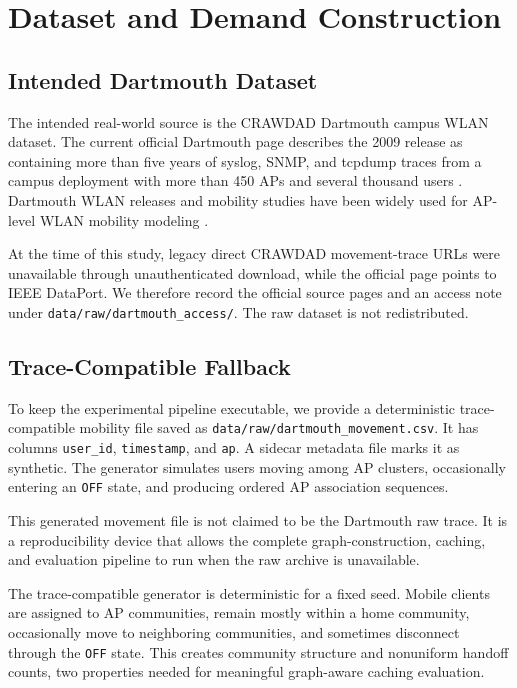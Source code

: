 \section{Dataset and Demand Construction}

\subsection{Intended Dartmouth Dataset}

The intended real-world source is the CRAWDAD Dartmouth campus WLAN dataset. The current official Dartmouth page describes the 2009 release as containing more than five years of syslog, SNMP, and tcpdump traces from a campus deployment with more than 450 APs and several thousand users \cite{kotz_dartmouth_campus_2009}. Dartmouth WLAN releases and mobility studies have been widely used for AP-level WLAN mobility modeling \cite{c71593-22,kim2005mobility_wifi_ap}.

At the time of this study, legacy direct CRAWDAD movement-trace URLs were unavailable through unauthenticated download, while the official page points to IEEE DataPort. We therefore record the official source pages and an access note under \texttt{data/raw/dartmouth\_access/}. The raw dataset is not redistributed.

\subsection{Trace-Compatible Fallback}

To keep the experimental pipeline executable, we provide a deterministic trace-compatible mobility file saved as \texttt{data/raw/dartmouth\_movement.csv}. It has columns \texttt{user\_id}, \texttt{timestamp}, and \texttt{ap}. A sidecar metadata file marks it as synthetic. The generator simulates users moving among AP clusters, occasionally entering an \texttt{OFF} state, and producing ordered AP association sequences.

This generated movement file is not claimed to be the Dartmouth raw trace. It is a reproducibility device that allows the complete graph-construction, caching, and evaluation pipeline to run when the raw archive is unavailable.

The trace-compatible generator is deterministic for a fixed seed. Mobile clients are assigned to AP communities, remain mostly within a home community, occasionally move to neighboring communities, and sometimes disconnect through the \texttt{OFF} state. This creates community structure and nonuniform handoff counts, two properties needed for meaningful graph-aware caching evaluation.

